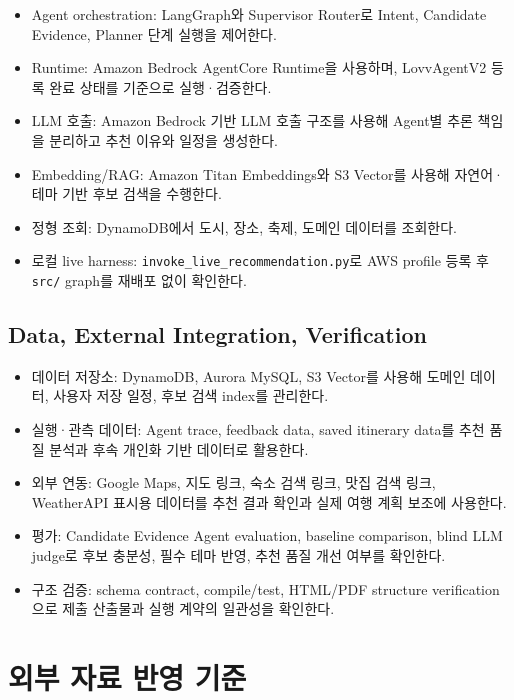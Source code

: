 \documentclass[12pt,a4paper]{article}
\newcommand{\DocNeedspace}[1]{\par\ifdim\dimexpr\pagegoal-\pagetotal\relax<#1\newpage\fi}
\newcommand{\TocNoChildTight}{\vspace{-0.28em}}
\begin{document}
\begin{itemize}
\item Agent orchestration: LangGraph와 Supervisor Router로 Intent, Candidate Evidence, Planner 단계 실행을 제어한다.
\item Runtime: Amazon Bedrock AgentCore Runtime을 사용하며, LovvAgentV2 등록 완료 상태를 기준으로 실행·검증한다.
\item LLM 호출: Amazon Bedrock 기반 LLM 호출 구조를 사용해 Agent별 추론 책임을 분리하고 추천 이유와 일정을 생성한다.
\item Embedding/RAG: Amazon Titan Embeddings와 S3 Vector를 사용해 자연어·테마 기반 후보 검색을 수행한다.
\item 정형 조회: DynamoDB에서 도시, 장소, 축제, 도메인 데이터를 조회한다.
\item 로컬 live harness: \texttt{invoke\_\allowbreak{}live\_\allowbreak{}recommendation.\allowbreak{}py}로 AWS profile 등록 후 \texttt{src/\allowbreak{}} graph를 재배포 없이 확인한다.
\end{itemize}


\DocNeedspace{24\baselineskip}
\subsection*{Data, External Integration, Verification}


\begin{itemize}
\item 데이터 저장소: DynamoDB, Aurora MySQL, S3 Vector를 사용해 도메인 데이터, 사용자 저장 일정, 후보 검색 index를 관리한다.
\item 실행·관측 데이터: Agent trace, feedback data, saved itinerary data를 추천 품질 분석과 후속 개인화 기반 데이터로 활용한다.
\item 외부 연동: Google Maps, 지도 링크, 숙소 검색 링크, 맛집 검색 링크, WeatherAPI 표시용 데이터를 추천 결과 확인과 실제 여행 계획 보조에 사용한다.
\item 평가: Candidate Evidence Agent evaluation, baseline comparison, blind LLM judge로 후보 충분성, 필수 테마 반영, 추천 품질 개선 여부를 확인한다.
\item 구조 검증: schema contract, compile/test, HTML/PDF structure verification으로 제출 산출물과 실행 계약의 일관성을 확인한다.
\end{itemize}


\newpage

\DocNeedspace{10\baselineskip}
\section*{외부 자료 반영 기준}
\addtocontents{toc}{\protect\TocNoChildTight}
\end{document}
